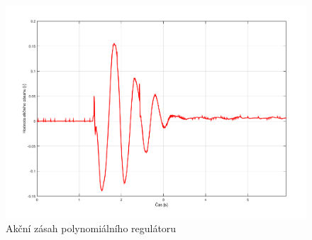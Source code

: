 \documentclass[a4paper,12pt]{article}
\begin{document}
\begin{figure}[H]
	\centering
    \includegraphics[scale=0.55]{odezva_kyvadlo_poly_akcnizasah}
    \caption{Akční zásah polynomiálního regulátoru}
\end{figure}
\end{document}

